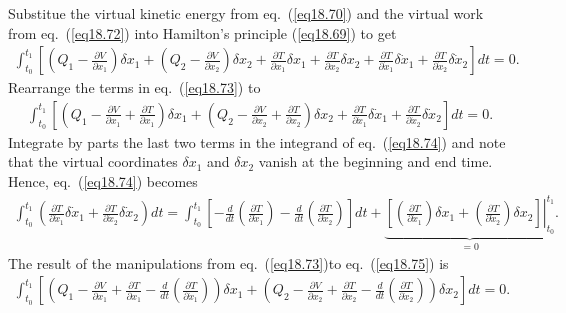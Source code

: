 \documentclass{AeroStructure-ERJohnson}
\begin{document}
\vspace*{-1.4pc}

Substitue the virtual kinetic energy from eq.~(\ref{eq18.70}) and the virtual work from eq.~(\ref{eq18.72}) into Hamilton's principle (\ref{eq18.69}) to get
\begin{align}\label{eq18.73}
\int_{t_0}^{t_1}\left[\left(Q_{1}-\frac{\partial V}{\partial x_{1}}\right) \delta x_{1}+\left(Q_{2}-\frac{\partial V}{\partial x_{2}}\right) \delta x_{2}+\frac{\partial T}{\partial x_{1}} \delta x_{1}+\frac{\partial T}{\partial x_{2}} \delta x_{2}+\frac{\partial T}{\partial \dot{x}_{1}} \delta \dot{x}_{1}+\frac{\partial T}{\partial \dot{x}_{2}} \delta \dot{x}_{2}\right] d t=0.
\end{align}
Rearrange the terms in eq.~(\ref{eq18.73}) to
\begin{align}\label{eq18.74}
\int_{t_0}^{t_1}\left[\left(Q_{1}-\frac{\partial V}{\partial x_{1}}+\frac{\partial T}{\partial x_{1}}\right) \delta x_{1}+\left(Q_{2}-\frac{\partial V}{\partial x_{2}}+\frac{\partial T}{\partial x_{2}}\right) \delta x_{2}+\frac{\partial T}{\partial \dot{x}_{1}} \delta \dot{x}_{1}+\frac{\partial T}{\partial \dot{x}_{2}} \delta \dot{x}_{2}\right] d t=0.
\end{align}
Integrate by parts the last two terms in the integrand of eq.~(\ref{eq18.74}) and note that the virtual coordinates $\delta x_{1}$ and $\delta x_{2}$ vanish at the beginning and end time. Hence, eq.~(\ref{eq18.74}) becomes
\begin{align}\label{eq18.75}
\int_{t_{0}}^{t_{1}}\left(\frac{\partial T}{\partial \dot{x}_{1}} \delta \dot{x}_{1}+\frac{\partial T}{\partial \dot{x}_{2}} \delta \dot{x}_{2}\right) d t=\int_{t_{0}}^{t_{1}}\left[-\frac{d}{d t}\left(\frac{\partial T}{\partial \dot{x}_{1}}\right)-\frac{d}{d t}\left(\frac{\partial T}{\partial \dot{x}_{2}}\right)\right] d t+\underbrace{\left.\left[\left(\frac{\partial T}{\partial \dot{x}_{1}}\right) \delta x_{1}+\left(\frac{\partial T}{\partial \dot{x}_{2}}\right) \delta x_{2}\right]\right|_{t_{0}} ^{t_{1}}}_{=0}.
\end{align}
The result of the manipulations from eq.~(\ref{eq18.73})to eq.~(\ref{eq18.75}) is
\begin{align}\label{eq18.76}
\int_{t_0}^{t_1}\left[\left(Q_{1}-\frac{\partial V}{\partial x_{1}}+\frac{\partial T}{\partial x_{1}}-\frac{d}{d t}\left(\frac{\partial T}{\partial \dot{x}_{1}}\right)\right) \delta x_{1}+\left(Q_{2}-\frac{\partial V}{\partial x_{2}}+\frac{\partial T}{\partial x_{2}}-\frac{d}{d t}\left(\frac{\partial T}{\partial \dot{x}_{2}}\right)\right) \delta x_{2}\right] d t=0.
\end{align}
\end{document}
